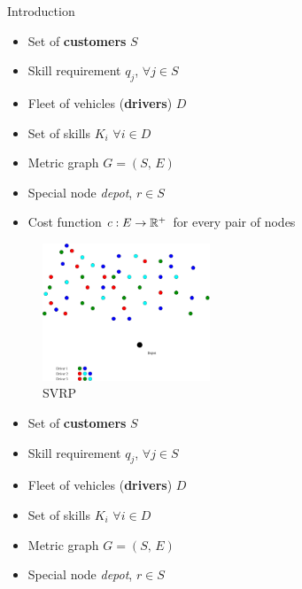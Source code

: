 \begin{frame}[t, allowframebreaks]{Introduction}
    \begin{minipage}[t]{0.48\textwidth}
        \begin{itemize}
            \item<1-> Set of \textbf{customers} $S$
            \item<2-> Skill requirement $q_j$,  $\forall j \in S$
            \item<3-> Fleet of vehicles (\textbf{drivers}) $D$
            \item<4-> Set of skills $K_i$ $\forall i \in D$
            \item<5-> Metric graph $G = (S, \, E)$
            \item<6-> Special node \emph{depot}, $r \in S$
            \item<7-> Cost function $c:E \rightarrow \mathbb{R}^+$ for every pair of nodes
        \end{itemize}
    \end{minipage}
    \begin{minipage}[t]{0.48\textwidth}
        \begin{figure}
            \centering
            \includegraphics[width=5cm]{VRPSS01.pdf}
            \caption{SVRP}
            \label{fig:my_label}
        \end{figure}            
    \end{minipage}
    \framebreak
    \begin{minipage}[t]{0.48\textwidth}
        \begin{itemize}
            \item Set of \textbf{customers} $S$
            \item Skill requirement $q_j$,  $\forall j \in S$
            \item Fleet of vehicles (\textbf{drivers}) $D$
            \item Set of skills $K_i$ $\forall i \in D$
            \item Metric graph $G = (S, \, E)$
            \item Special node \emph{depot}, $r \in S$

\end{itemize}
\end{minipage}
\end{frame}
